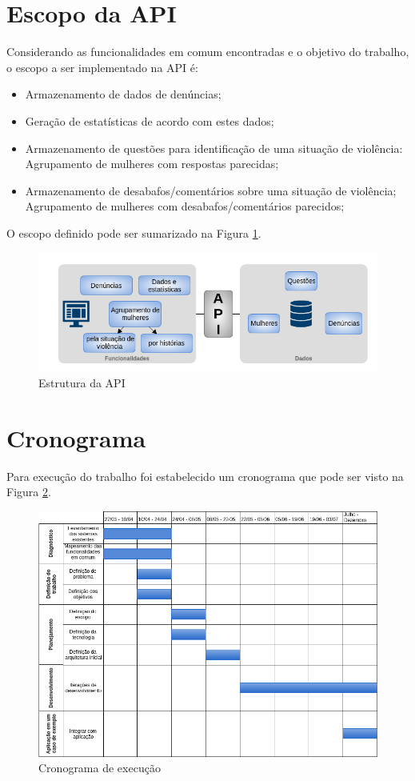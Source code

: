 \section{Escopo da API}

Considerando as funcionalidades em comum encontradas e o objetivo do trabalho, o escopo a ser implementado na API é:

\begin{itemize}
	\item Armazenamento de dados de denúncias;
	\item Geração de estatísticas de acordo com estes dados;
	\item Armazenamento de questões para identificação de uma situação de violência:
		\subitem Agrupamento de mulheres com respostas parecidas;
	\item Armazenamento de desabafos/comentários sobre uma situação de violência;
		\subitem Agrupamento de mulheres com desabafos/comentários parecidos;
\end{itemize}

O escopo definido pode ser sumarizado na Figura \ref{fig:estrutura_api}.

\begin{figure}[h!]
\centering
\includegraphics[scale=0.7]{figuras/estrutura_api.png}
\caption{Estrutura da API}
\label{fig:estrutura_api}
\end{figure}



\section{Cronograma}

Para execução do trabalho foi estabelecido um cronograma que pode ser visto na Figura \ref{fig:cronograma}.

\begin{figure}[h!]
\centering
\includegraphics[scale=0.6]{figuras/cronograma.png}
\caption{Cronograma de execução}
\label{fig:cronograma}
\end{figure}
